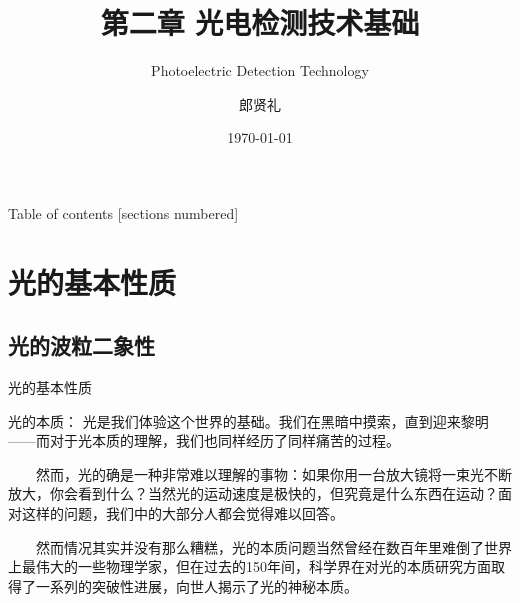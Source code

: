 \documentclass[trans]{beamer} %
\title{第二章 光电检测技术基础}%
\subtitle{Photoelectric Detection Technology}
\date{\today}
\author{郎贤礼}
\institute{仪器学院  HFUT}
\begin{document}
\maketitle

\begin{frame}{Table of contents}
  [sections numbered]
  \tableofcontents[hideallsubsections]
\end{frame}

\section{光的基本性质}
\subsection{光的波粒二象性}

\begin{frame}[fragile]{光的基本性质}
\begin{alertblock}{光的本质：}
	光是我们体验这个世界的基础。我们在黑暗中摸索，直到迎来黎明——而对于光本质的理解，我们也同样经历了同样痛苦的过程。

　　然而，光的确是一种非常难以理解的事物：如果你用一台放大镜将一束光不断放大，你会看到什么？当然光的运动速度是极快的，但究竟是什么东西在运动？面对这样的问题，我们中的大部分人都会觉得难以回答。

　　然而情况其实并没有那么糟糕，光的本质问题当然曾经在数百年里难倒了世界上最伟大的一些物理学家，但在过去的150年间，科学界在对光的本质研究方面取得了一系列的突破性进展，向世人揭示了光的神秘本质。

\end{alertblock}
	
	
\end{frame}
\end{document}
